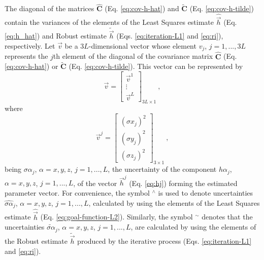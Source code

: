 \documentclass[journal abbreviation, npg]{copernicus}
\begin{document}
The diagonal of the matrices $\hat{\mathbf{C}}$ (Eq. \ref{eq:cov-h-hat}) and $\tilde{\mathbf{C}}$ (Eq. \ref{eq:cov-h-tilde}) contain the variances of the elements of the Least Squares estimate $\hat{\vec{h}}$ (Eq. \ref{eq:h_hat}) and Robust estimate $\tilde{\vec{h}}$ (Eqs. \ref{eq:iteration-L1} and \ref{eq:ri}), respectively. Let $\vec{v}$ be a $3L$-dimensional vector whose element $v_{j}$, $j = 1, ..., 3L$ represents the $j$th element of the diagonal of the covariance matrix $\hat{\mathbf{C}}$ (Eq. \ref{eq:cov-h-hat}) or $\tilde{\mathbf{C}}$ (Eq. \ref{eq:cov-h-tilde}). This vector can be represented by
\begin{equation}
\vec{v} = 
\left[
\begin{array}{cc}
\vec{v}^{1} \\
\vdots \\
\vec{v}^{L}
\end{array}
\right]_{3L \times 1} \: ,
\label{eq:v}
\end{equation}
where
\begin{equation}
\vec{v}^{j} = 
\left[
\begin{array}{cc}
\left( \sigma x_{j} \right)^{2} \\
\left( \sigma y_{j} \right)^{2} \\
\left( \sigma z_{j} \right)^{2}
\end{array}
\right]_{3 \times 1} \: ,
\label{eq:vj}
\end{equation}
being ${\sigma \alpha}_{j}$, $\alpha = x, y, z$, $j = 1, ..., L$, the uncertainty of the component ${h \alpha}_{j}$, $\alpha = x, y, z$, $j = 1, ..., L$, of the vector $\vec{h}^{j}$ (Eq. \ref{eq:hj}) forming the estimated parameter vector. For convenience, the symbol $^\wedge$ is used to denote uncertainties $\hat{\sigma \alpha}_{j}$, $\alpha = x, y, z$, $j = 1, ..., L$, calculated by using the elements of the Least Squares estimate $\hat{\vec{h}}$ (Eq. \ref{eq:goal-function-L2}). Similarly, the symbol $^\sim$ denotes that the uncertainties $\tilde{\sigma \alpha}_{j}$, $\alpha = x, y, z$, $j = 1, ..., L$, are calculated by using the elements of the Robust estimate $\tilde{\vec{h}}$ produced by the iterative process (Eqs. \ref{eq:iteration-L1} and \ref{eq:ri}).
\end{document}
